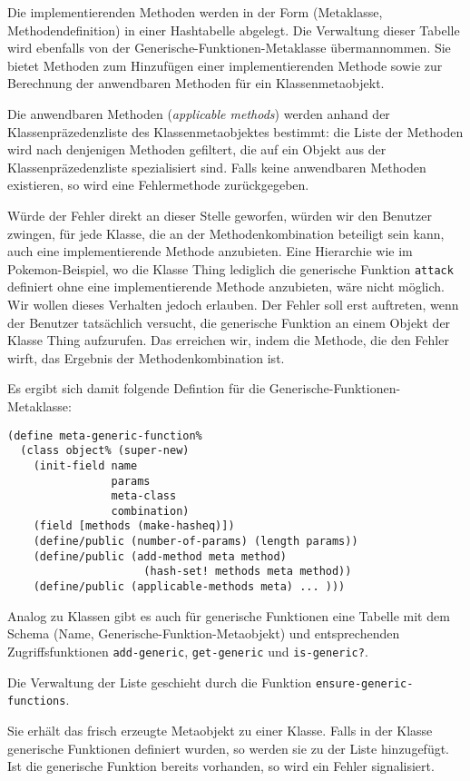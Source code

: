 Die implementierenden Methoden werden in der Form (Metaklasse, Methodendefinition) in einer Hashtabelle abgelegt. Die Verwaltung dieser Tabelle wird ebenfalls von der Generische-Funktionen-Metaklasse übermannommen. Sie bietet Methoden zum Hinzufügen einer implementierenden Methode sowie zur Berechnung der anwendbaren Methoden für ein Klassenmetaobjekt.

Die anwendbaren Methoden (\emph{applicable methods}) werden anhand der Klassenpräzedenzliste des Klassenmetaobjektes bestimmt: die Liste der Methoden wird nach denjenigen Methoden gefiltert, die auf ein Objekt aus der Klassenpräzedenzliste spezialisiert sind. Falls keine anwendbaren Methoden existieren, so wird eine Fehlermethode zurückgegeben. 

Würde der Fehler direkt an dieser Stelle geworfen, würden wir den Benutzer zwingen, für jede Klasse, die an der Methodenkombination beteiligt sein kann, auch eine implementierende Methode anzubieten. Eine Hierarchie wie im Pokemon-Beispiel, wo die Klasse Thing lediglich die generische Funktion \texttt{attack} definiert ohne eine implementierende Methode anzubieten, wäre nicht möglich. Wir wollen dieses Verhalten jedoch erlauben. Der Fehler soll erst auftreten, wenn der Benutzer tatsächlich versucht, die generische Funktion an einem Objekt der Klasse Thing aufzurufen. Das erreichen wir, indem die Methode, die den Fehler wirft, das Ergebnis der Methodenkombination ist.

Es ergibt sich damit folgende Defintion für die Generische-Funktionen-Metaklasse:

\begin{lstlisting}
(define meta-generic-function%
  (class object% (super-new)
    (init-field name
                params
                meta-class
                combination) 
    (field [methods (make-hasheq)]) 
    (define/public (number-of-params) (length params))
    (define/public (add-method meta method) 
                     (hash-set! methods meta method))
    (define/public (applicable-methods meta) ... )))
\end{lstlisting}

Analog zu Klassen gibt es auch für generische Funktionen eine Tabelle mit dem Schema (Name, Generische-Funktion-Metaobjekt) und entsprechenden Zugriffsfunktionen \texttt{add-generic}, \texttt{get-generic} und \texttt{is-generic?}.

Die Verwaltung der Liste geschieht durch die Funktion \texttt{ensure-generic-functions}. 

Sie erhält das frisch erzeugte Metaobjekt zu einer Klasse. Falls in der Klasse generische Funktionen definiert wurden, so werden sie zu der Liste hinzugefügt. Ist die generische Funktion bereits vorhanden, so wird ein Fehler signalisiert.

